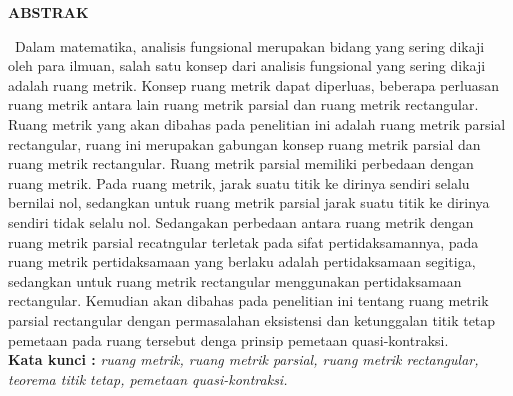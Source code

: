 \documentclass[12pt]{article}
\numberwithin{lemma}{subsection}
\begin{document}

{}

\begin{center}
	\textbf{ABSTRAK}
	
\end{center}
$\,$\hskip 1cm Dalam matematika, analisis fungsional merupakan bidang yang sering dikaji oleh para ilmuan, salah satu konsep dari analisis fungsional yang sering dikaji adalah ruang metrik. Konsep ruang metrik dapat diperluas, beberapa perluasan ruang metrik antara lain ruang metrik parsial dan ruang metrik rectangular. Ruang metrik yang akan dibahas pada penelitian ini adalah ruang metrik parsial rectangular,  ruang ini merupakan gabungan konsep ruang metrik parsial dan ruang metrik rectangular. Ruang metrik parsial memiliki perbedaan dengan ruang metrik. Pada ruang metrik, jarak suatu titik ke dirinya sendiri selalu bernilai nol, sedangkan untuk ruang metrik parsial jarak suatu titik ke dirinya sendiri tidak selalu nol. Sedangakan perbedaan antara ruang metrik dengan ruang metrik parsial recatngular terletak pada sifat pertidaksamannya, pada ruang metrik pertidaksamaan yang berlaku adalah pertidaksamaan segitiga, sedangkan untuk ruang metrik rectangular menggunakan pertidaksamaan rectangular. Kemudian akan dibahas pada penelitian ini tentang ruang metrik parsial rectangular dengan permasalahan eksistensi dan ketunggalan titik tetap pemetaan pada ruang tersebut denga prinsip pemetaan quasi-kontraksi.  \\

\textbf{Kata kunci :} \textit{ruang metrik, ruang metrik parsial, ruang metrik rectangular, teorema titik tetap, pemetaan quasi-kontraksi.}
\end{document}
